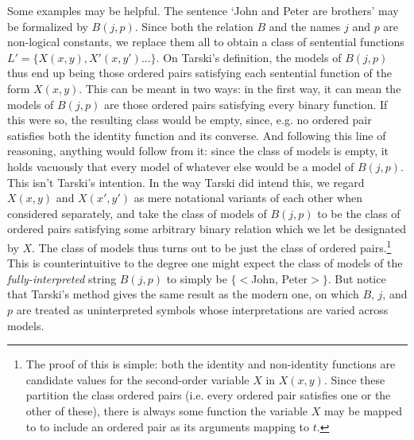 \documentclass[]{article}
\begin{document}
Some examples may be helpful. The sentence `John and Peter are brothers' may be formalized by $B(j, p)$. Since both the relation $B$ and the names $j$ and $p$ are non-logical constants, we replace them all to obtain a class of sentential functions $L' = \{X(x, y), X'(x, y')...\}$. On Tarski's definition, the models of $B(j, p)$ thus end up being those ordered pairs satisfying each sentential function of the form $X(x, y)$. This can be meant in two ways: in the first way, it can mean the models of $B(j, p)$ are those ordered pairs satisfying every binary function. If this were so, the resulting class would be empty, since, e.g. no ordered pair satisfies both the identity function and its converse. And following this line of reasoning, anything would follow from it: since the class of models is empty, it holds vacuously that every model of whatever else would be a model of $B(j, p)$. This isn't Tarski's intention. In the way Tarski did intend this, we regard $X(x, y)$ and $X(x', y')$ as mere notational variants of each other when considered separately, and take the class of models of $B(j, p)$ to be the class of ordered pairs satisfying some arbitrary binary relation which we let be designated by $X$. The class of models thus turns out to be just the class of ordered pairs.\footnote{The proof of this is simple: both the identity and non-identity functions are candidate values for the second-order variable $X$ in $X(x, y)$. Since these partition the class ordered pairs (i.e. every ordered pair satisfies one or the other of these), there is always some function the variable $X$ may be mapped to to include an ordered pair as its arguments mapping to $t$.} This is counterintuitive to the degree one might expect the class of models of the \textit{fully-interpreted} string $B(j, p)$ to simply be $\{<$John, Peter$>\}$. But notice that Tarski's method gives the same result as the modern one, on which $B$, $j$, and $p$ are treated as uninterpreted symbols whose interpretations are varied across models.
\end{document}
